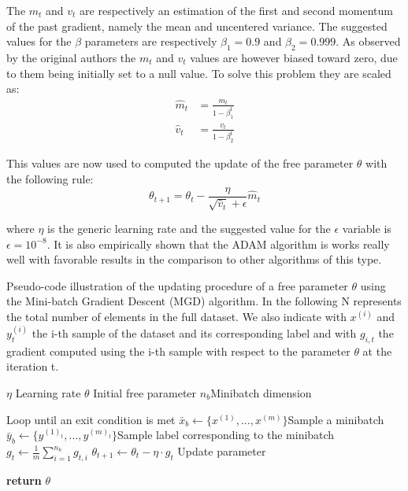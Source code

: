 The $m_t$ and $v_t$ are respectively an estimation of the first and second momentum of the past gradient, namely the mean and uncentered variance. The suggested values for the $\beta$ parameters are respectively $\beta_1=0.9$ and $\beta_2=0.999$. As observed by the original authors the $m_t$ and $v_t$ values are however biased toward zero, due to them being initially set to a null value. To solve this problem they are scaled as:
\begin{equation}
\begin{aligned}
\hat{m}_{t} &=\frac{m_{t}}{1-\beta_{1}^{t}} \\
\hat{v}_{t} &=\frac{v_{t}}{1-\beta_{2}^{t}}
\end{aligned}
\end{equation}

This values are now used to computed the update of the free parameter $\theta$ with the following rule:
\begin{equation}
\theta_{t+1}=\theta_{t}-\frac{\eta}{\sqrt{\hat{v}_{t}}+\epsilon} \hat{m}_{t}
\end{equation}

where $\eta$ is the generic learning rate and the suggested value for the $\epsilon$ variable is $\epsilon=10^{-8}$. It is also empirically shown that the ADAM algorithm is works really well with favorable results in the comparison to other algorithms of this type.

\begin{algorithm}[H]
\caption{Pseudo-code illustration of the updating procedure of a free parameter $\theta$ using the Mini-batch Gradient Descent (MGD) algorithm. In the following N represents the total number of elements in the full dataset. We also indicate with $x^{(i)}$ and $y^{(i)}_t$ the i-th sample of the dataset and its corresponding label and with $g_{i,t}$ the gradient computed using the i-th sample with respect to the parameter $\theta$ at the iteration t. }
\label{alg:mgd}
\begin{algorithmic}[1]
\Require $\eta$ \Comment Learning rate
\Require ${\theta}$ \Comment Initial free parameter
\Require $n_b$\Comment Minibatch dimension 

 \Comment Loop until an exit condition is met
\State $\bar{x}_b \gets \{x^{(1)},\dots,x^{(m)}\}$\Comment Sample a minibatch
\State $\bar{y}_b \gets \{y^{(1)_t},\dots,y^{(m)_t}\}$\Comment Sample label corresponding to the minibatch
\State ${g}_t \gets  \frac{1}{m} \sum_{i=1}^{n_b} g_{t,i}$ 
\State $\theta_{t+1} \gets \theta_t - \eta\cdot {g}_t$ \Comment Update parameter
\EndWhile

\State \textbf{return} ${\theta}$
\EndProcedure
\end{algorithmic}
\end{algorithm}




